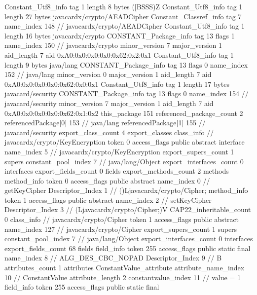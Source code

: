 {{{		}
		Constant_Utf8_info {
			tag	1
			length	8
			bytes	([BSSS)Z
		}
		Constant_Utf8_info {
			tag	1
			length	27
			bytes	javacardx/crypto/AEADCipher
		}
		Constant_Classref_info {
			tag	7
			name_index	148		// javacardx/crypto/AEADCipher
		}
		Constant_Utf8_info {
			tag	1
			length	16
			bytes	javacardx/crypto
		}
		CONSTANT_Package_info {
			tag	13
			flags	1
			name_index	150		// javacardx/crypto
			minor_version	7
			major_version	1
			aid_length	7
			aid	0xA0:0x0:0x0:0x0:0x62:0x2:0x1
		}
		Constant_Utf8_info {
			tag	1
			length	9
			bytes	java/lang
		}
		CONSTANT_Package_info {
			tag	13
			flags	0
			name_index	152		// java/lang
			minor_version	0
			major_version	1
			aid_length	7
			aid	0xA0:0x0:0x0:0x0:0x62:0x0:0x1
		}
		Constant_Utf8_info {
			tag	1
			length	17
			bytes	javacard/security
		}
		CONSTANT_Package_info {
			tag	13
			flags	0
			name_index	154		// javacard/security
			minor_version	7
			major_version	1
			aid_length	7
			aid	0xA0:0x0:0x0:0x0:0x62:0x1:0x2
		}
	}
	this_package	151
	referenced_package_count	2
	referencedPackage[0]	153		// java/lang
	referencedPackage[1]	155		// javacard/security
	export_class_count	4
	export_classes {
		class_info {		// javacardx/crypto/KeyEncryption
			token	0
			access_flags	public abstract interface
			name_index	5		// javacardx/crypto/KeyEncryption
			export_supers_count	1
			supers {
				constant_pool_index	7		// java/lang/Object
			}
			export_interfaces_count	0
			interfaces {
			}
			export_fields_count	0
			fields {
			}
			export_methods_count	2
			methods {
				method_info {
					token	0
					access_flags	public abstract
					name_index	0		// getKeyCipher
					Descriptor_Index	1		// ()Ljavacardx/crypto/Cipher;
				}
				method_info {
					token	1
					access_flags	public abstract
					name_index	2		// setKeyCipher
					Descriptor_Index	3		// (Ljavacardx/crypto/Cipher;)V
				}
			}
			CAP22_inheritable_count	0
		}
		class_info {		// javacardx/crypto/Cipher
			token	1
			access_flags	public abstract
			name_index	127		// javacardx/crypto/Cipher
			export_supers_count	1
			supers {
				constant_pool_index	7		// java/lang/Object
			}
			export_interfaces_count	0
			interfaces {
			}
			export_fields_count	68
			fields {
			field_info {
				token	255
				access_flags	public static final
				name_index	8		// ALG_DES_CBC_NOPAD
				Descriptor_Index	9		// B
				attributes_count	1
				attributes {
				ConstantValue_attribute {
					attribute_name_index	10		// ConstantValue
					attribute_length	2
					constantvalue_index	11		// value = 1
				}
				}
			}
			field_info {
				token	255
				access_flags	public static final
}}}}}
